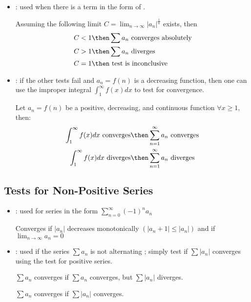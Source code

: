 \begin{itemize}
  \item {}: used when there is a term in the form of
    .

    Assuming the following limit \(C = \lim_{n \to \infty}
    |a_n|^{\frac{1}{n}} \) exists, then
    \begin{align*}
      C &< 1 \then \sum a_n ~\text{converges absolutely} \\
      C &> 1 \then \sum a_n ~\text{diverges} \\
      C &= 1 \then ~\text{test is inconclusive}~
    \end{align*}

  \item {}: if the other tests fail and \(a_n = f(n)\) is
    a decreasing function, then one can use the improper integral
    \(\int_1^\infty f(x)dx\) to test for convergence.

    Let \(a_n = f(n)\) be a positive, decreasing, and continuous function
    \(\forall x \geq 1\), then:
    \begin{align*}
      \int_1^\infty f(x)dx ~\text{converges} &\then \sum_{n=1}^{\infty}
      a_n ~\text{converges}\\
      \int_1^\infty f(x)dx ~\text{diverges} &\then \sum_{n=1}^{\infty}
      a_n ~\text{diverges}
    \end{align*}
\end{itemize}

\subsection{Tests for Non-Positive Series}
\vspace{-8pt}
  \begin{itemize}
    \item {}: used for series in the form
      \(%
      \displaystyle  \sum_{n=0}^{\infty} (-1)^n a_n
      \)%

      Converges if \(|a_n|\) decreases monotonically \(\left(|a_n+1| \leq |a_n|\right)\)
      and if \(\lim_{n \to \infty} a_n = 0\)

      \vspace{16pt}

    \item {}: used if the series \(\sum a_n\) is not
      alternating ; simply test if \(\sum |a_n| \) converges using the test
      for positive series.

      \vspace{16pt}

      \(\sum a_n\) converges  if \(\sum a_n\) converges, but \(\sum
      |a_n|\) diverges.

      \(\sum a_n\) converges  if \(\sum |a_n|\) converges.


  \end{itemize}



